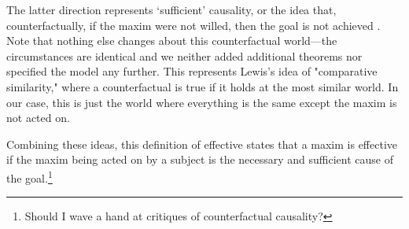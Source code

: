 \begin{isabellebody}
\begin{isamarkuptext}
The latter direction represents `sufficient' causality, or the idea that, counterfactually,
if the maxim were not willed, then the goal is not achieved \cite{lewiscausality}. Note that nothing else changes about this
counterfactual world—the circumstances are identical and we neither added additional theorems nor 
specified the model any further. This represents Lewis's idea of "comparative similarity," \cite{lewiscounterfactuals} where 
a counterfactual is true if it holds at the most similar world. In our case, this is just the world 
where everything is the same except the maxim is not acted on.

Combining these ideas, this definition of effective states that a maxim is effective if the 
maxim being acted on by a subject is the necessary and sufficient cause of the goal.\footnote{Should I wave a hand at critiques of counterfactual causality?}


\end{isamarkuptext}
\end{isabellebody}
